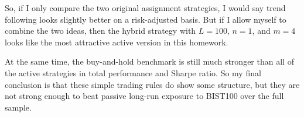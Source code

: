 \documentclass[11pt]{article}
\begin{document}
So, if I only compare the two original assignment strategies, I would say trend following looks slightly better on a risk-adjusted basis. But if I allow myself to combine the two ideas, then the hybrid strategy with $L=100$, $n=1$, and $m=4$ looks like the most attractive active version in this homework.

At the same time, the buy-and-hold benchmark is still much stronger than all of the active strategies in total performance and Sharpe ratio. So my final conclusion is that these simple trading rules do show some structure, but they are not strong enough to beat passive long-run exposure to BIST100 over the full sample.
\end{document}
